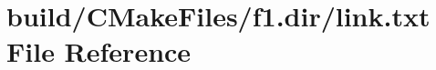 \hypertarget{f1_8dir_2link_8txt}{}\section{build/\+C\+Make\+Files/f1.dir/link.txt File Reference}
\label{f1_8dir_2link_8txt}
